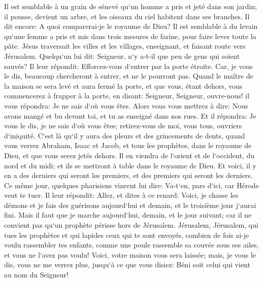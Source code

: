 \verse Il est semblable à un grain de sénevé qu`un homme a pris et jeté dans son jardin; il pousse, devient un arbre, et les oiseaux du ciel habitent dans ses branches. 
\verse Il dit encore: A quoi comparerai-je le royaume de Dieu? 
\verse Il est semblable à du levain qu`une femme a pris et mis dans trois mesures de farine, pour faire lever toute la pâte. 
\verse Jésus traversait les villes et les villages, enseignant, et faisant route vers Jérusalem. 
\verse Quelqu`un lui dit: Seigneur, n`y a-t-il que peu de gens qui soient sauvés? Il leur répondit: 
\verse Efforcez-vous d`entrer par la porte étroite. Car, je vous le dis, beaucoup chercheront à entrer, et ne le pourront pas. 
\verse Quand le maître de la maison se sera levé et aura fermé la porte, et que vous, étant dehors, vous commencerez à frapper à la porte, en disant: Seigneur, Seigneur, ouvre-nous! il vous répondra: Je ne sais d`où vous êtes. 
\verse Alors vous vous mettrez à dire: Nous avons mangé et bu devant toi, et tu as enseigné dans nos rues. 
\verse Et il répondra: Je vous le dis, je ne sais d`où vous êtes; retirez-vous de moi, vous tous, ouvriers d`iniquité. 
\verse C`est là qu`il y aura des pleurs et des grincements de dents, quand vous verrez Abraham, Isaac et Jacob, et tous les prophètes, dans le royaume de Dieu, et que vous serez jetés dehors. 
\verse Il en viendra de l`orient et de l`occident, du nord et du midi; et ils se mettront à table dans le royaume de Dieu. 
\verse Et voici, il y en a des derniers qui seront les premiers, et des premiers qui seront les derniers. 
\verse Ce même jour, quelques pharisiens vinrent lui dire: Va-t`en, pars d`ici, car Hérode veut te tuer. 
\verse Il leur répondit: Allez, et dites à ce renard: Voici, je chasse les démons et je fais des guérisons aujourd`hui et demain, et le troisième jour j`aurai fini. 
\verse Mais il faut que je marche aujourd`hui, demain, et le jour suivant; car il ne convient pas qu`un prophète périsse hors de Jérusalem. 
\verse Jérusalem, Jérusalem, qui tues les prophètes et qui lapides ceux qui te sont envoyés, combien de fois ai-je voulu rassembler tes enfants, comme une poule rassemble sa couvée sous ses ailes, et vous ne l`avez pas voulu! 
\verse Voici, votre maison vous sera laissée; mais, je vous le dis, vous ne me verrez plus, jusqu`à ce que vous disiez: Béni soit celui qui vient au nom du Seigneur! 

